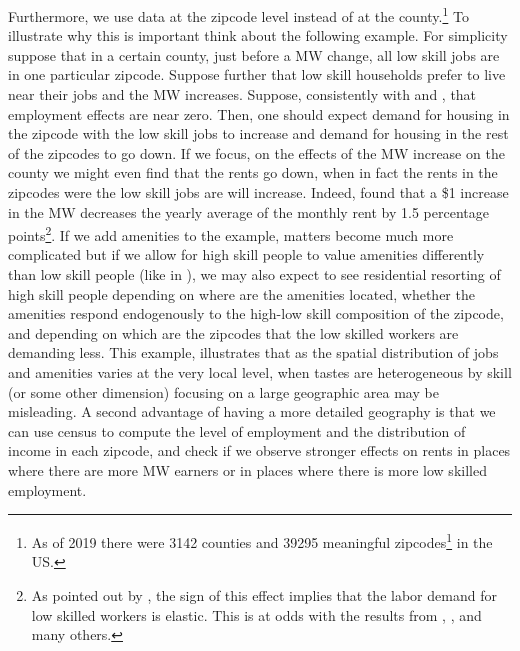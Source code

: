 Furthermore, we use data at the zipcode level instead of at the county.\footnote{As of 2019 there were 3142 counties and 39295 meaningful zipcodes\footnote{We exclude military and unique business zipcodes as they are irrelevant for house prices.} in the US.} To illustrate why this is important think about the following example. For simplicity suppose that in a certain county, just before a MW change, all low skill jobs are in one particular zipcode. Suppose further that low skill households prefer to live near their jobs and the MW increases. Suppose, consistently with \textcite{card2000minimum} and \textcite{cengiz2019effect}, that employment effects are near zero. Then, one should expect demand for housing in the zipcode with the low skill jobs to increase and demand for housing in the rest of the zipcodes to go down. If we focus, on the effects of the MW increase on the county we might even find that the rents go down, when in fact the rents in the zipcodes were the low skill jobs are will increase. Indeed, \textcite{tidemann2018mw} found that a \$1 increase in the MW decreases the yearly average of the monthly rent by 1.5 percentage points\footnote{As pointed out by \textcite{tidemann2018mw}, the sign of this effect implies that the labor demand for low skilled workers is elastic. This is at odds with the results from \textcite{card2000minimum}, \textcite{cengiz2019effect}, and many others.}. If we add amenities to the example, matters become much more complicated but if we allow for high skill people to value amenities differently than low skill people (like in \textcite{diamond2016determinants}), we may also expect to see residential resorting of high skill people depending on where are the amenities located, whether the amenities respond endogenously to the high-low skill composition of the zipcode, and depending on which are the zipcodes that the low skilled workers are demanding less. This example, illustrates that as the spatial distribution of jobs and amenities varies at the very local level, when tastes are heterogeneous by skill (or some other dimension) focusing on a large geographic area may be misleading. A second advantage of having a more detailed geography is that we can use census to compute the level of employment and the distribution of income in each zipcode, and check if we observe stronger effects on rents in places where there are more MW earners or in places where there is more low skilled employment. 

